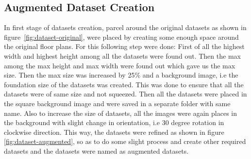             \subsection{Augmented Dataset Creation}
            In first stage of datasets creation, parcel around the original datasets as shown in figure~\ref{fig:dataset-original}, were placed by creating some enough space around the original floor plans. For this following step were done: First of all the highest width and highest height among all the datasets were found out.  Then the max among the max height and max width were found out which gave us the max size. Then the max size was increased by 25\% and a background image, i.e the foundation size of the datasets was created. This was done to ensure that all the datasets were of same size and not squeezed. Then all the datasets were placed in the square background image and were saved in a separate folder with same name. Also to increase the size of datasets, all the images were again places in the background with slight change in orientation, i.e 30 degree rotation in clockwise direction. This way, the datasets were refined as shown in figure \ref{fig:dataset-augmented}, so as to do some slight process and create other required datasets and the datasets were named as augmented datasets.
